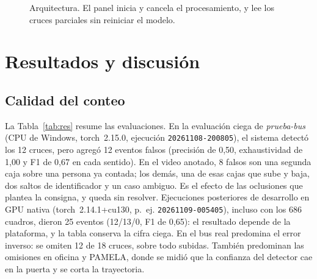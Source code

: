 \documentclass[conference,a4paper]{IEEEtran}
\begin{document}
\begin{figure}[!t]
\centering
{}
\caption{Arquitectura. El panel inicia y cancela el procesamiento, y lee los cruces parciales sin reiniciar el modelo.}
\label{fig:arq}
\end{figure}

\section{Resultados y discusión}
\subsection{Calidad del conteo}
La Tabla~\ref{tab:res} resume las evaluaciones. En la evaluación ciega de \emph{prueba-bus} (CPU de Windows, torch~2.15.0, ejecución \texttt{20261108-200805}), el sistema detectó los 12 cruces, pero agregó 12 eventos falsos (precisión de 0,50, exhaustividad de 1,00 y F1 de 0,67 en cada sentido). En el video anotado, 8 falsos son una segunda caja sobre una persona ya contada; los demás, una de esas cajas que sube y baja, dos saltos de identificador y un caso ambiguo. Es el efecto de las oclusiones que plantea la consigna, y queda sin resolver. Ejecuciones posteriores de desarrollo en GPU nativa (torch~2.14.1+cu130, p.~ej. \texttt{20261109-005405}), incluso con los 686 cuadros, dieron 25 eventos (12/13/0, F1 de 0,65): el resultado depende de la plataforma, y la tabla conserva la cifra ciega. En el bus real predomina el error inverso: se omiten 12 de 18 cruces, sobre todo subidas. También predominan las omisiones en oficina y PAMELA, donde se midió que la confianza del detector cae en la puerta y se corta la trayectoria.
\end{document}
